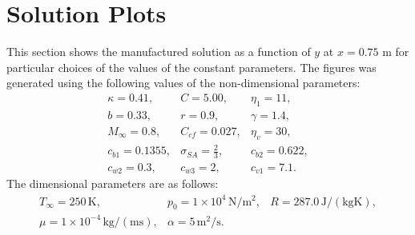 % 
% 
% 

%
\section{Solution Plots} \label{sec:soln_plots}
This section shows the manufactured solution as a function of $y$ at
$x=0.75$ m for particular choices of the values of the constant
parameters.  The figures was generated using the
following values of the non-dimensional parameters:
%
\begin{equation*}
\begin{array}{ccc}
\kappa = 0.41, & C    =  5.00, & \eta_1 = 11, \\
b = 0.33, & r = 0.9, & \gamma = 1.4, \\
M_{\infty} = 0.8, & C_{cf} = 0.027, & \eta_v = 30, \\
c_{b1} = 0.1355, & \sigma_{SA} = \frac{2}{3}, & c_{b2} = 0.622, \\
c_{w2} = 0.3, & c_{w3} = 2, & c_{v1} = 7.1.
\end{array}
\end{equation*}
%
The dimensional parameters are as follows:
%
\begin{equation*}
\begin{array}{ccc}
T_{\infty} = 250 \, \mathrm{K}, & p_0 = 1 \times 10^4 \, \mathrm{N/m^2}, & R = 287.0 \, \mathrm{J/(kg K)}, \\
\mu = 1 \times 10^{-4} \, \mathrm{kg/(m s)}, & \alpha = 5 \, \mathrm{m^2/s}. & 
\end{array}
\end{equation*}
%

